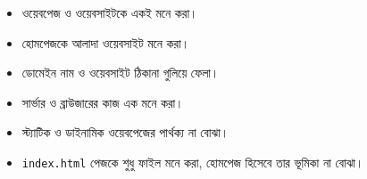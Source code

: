 \par\noindent
\begin{minipage}[t]{.48\linewidth}\vspace{0pt}
\begin{itemize}
\item ওয়েবপেজ ও ওয়েবসাইটকে একই মনে করা।
\item হোমপেজকে আলাদা ওয়েবসাইট মনে করা।
\item ডোমেইন নাম ও ওয়েবসাইট ঠিকানা গুলিয়ে ফেলা।
\end{itemize}
\end{minipage}\hfill
\begin{minipage}[t]{.48\linewidth}\vspace{0pt}
\begin{itemize}
\item সার্ভার ও ব্রাউজারের কাজ এক মনে করা।
\item স্ট্যাটিক ও ডাইনামিক ওয়েবপেজের পার্থক্য না বোঝা।
\item \texttt{index.html} পেজকে শুধু ফাইল মনে করা, হোমপেজ হিসেবে তার ভূমিকা না বোঝা।
\end{itemize}
\end{minipage}\par


